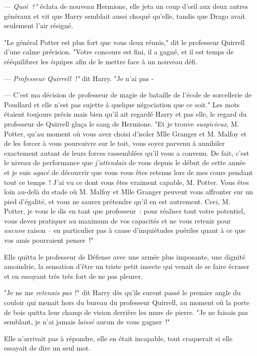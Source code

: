 --- \emph{Quoi~?"} éclata de nouveau Hermione, elle jeta un coup d'œil aux deux autres généraux et vit que Harry semblait aussi choqué qu'elle, tandis que Drago avait seulement l'air résigné.

"Le général Potter est plus fort que vous deux réunis," dit le professeur Quirrell d'une calme précision. "Votre concours est fini, il a gagné, et il est temps de rééquilibrer les équipes afin de le mettre face à un nouveau défi.

--- \emph{Professeur Quirrell~!"} dit Harry. "Je n'ai pas -

--- C'est ma décision de professeur de magie de bataille de l'école de sorcellerie de Poudlard et elle n'est pas sujette à quelque négociation que ce soit." Les mots étaient toujours précis mais bien qu'il ait regardé Harry et pas elle, le regard du professeur de Quirrell glaça le sang de Hermione. "Et je trouve \emph{suspicieux}, M. Potter, qu'au moment où vous avez choisi d'isoler Mlle Granger et M. Malfoy et de les forcer à vous poursuivre sur le toit, vous soyez parvenu à annihiler exactement autant de leurs forces rassemblées qu'il vous a convenu. De fait, c'est le niveau de performance que \emph{j'attendais} de vous depuis le début de cette année et je suis \emph{agacé} de découvrir que vous vous êtes retenus lors de mes cours pendant tout ce temps~! J'ai vu ce dont vous êtes vraiment capable, M. Potter. Vous êtes loin au-delà du stade où M. Malfoy et Mlle Granger peuvent vous affronter sur un pied d'égalité, et vous ne saurez prétendre qu'il en est autrement. Ceci, M. Potter, je vous le dis en tant que professeur~: pour réaliser tout votre potentiel, vous devez pratiquer au maximum de vos capacités et ne vous retenir pour \emph{aucune} raison -- en particulier pas à cause d'inquiétudes puériles quant à ce que vos amis pourraient penser~!"

\later

Elle quitta le professeur de Défense avec une armée plus imposante, une dignité amoindrie, la sensation d'être un triste petit insecte qui venait de se faire écraser et en essayant très très fort de ne pas pleurer.

"Je ne me \emph{retenais pas}~!" dit Harry dès qu'ils eurent passé le premier angle du couloir qui menait hors du bureau du professeur Quirrell, au moment où la porte de bois quitta leur champ de vision derrière les murs de pierre. "Je ne faisais pas semblant, je n'ai jamais \emph{laissé} aucun de vous gagner~!"

Elle n'arrivait pas à répondre, elle en était incapable, tout craquerait si elle essayait de dire un seul mot.

